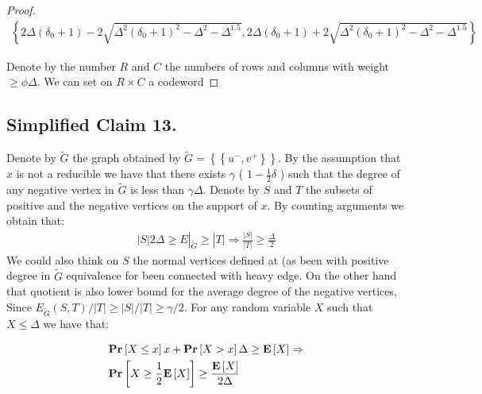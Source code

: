 \begin{proof}
\begin{equation*}
  \begin{split}
    \left\{2 \Delta \left(\delta_{0} + 1\right) - 2 \sqrt{\Delta^{2} \left(\delta_{0} + 1\right)^{2} - \Delta^{2} - \Delta^{1.5}}, 2 \Delta \left(\delta_{0} + 1\right) + 2 \sqrt{\Delta^{2} \left(\delta_{0} + 1\right)^{2} - \Delta^{2} - \Delta^{1.5}}\right\}
  \end{split}
\end{equation*}

Denote by the number $R $ and $C$ the numbers of rows and columns with weight $\ge \phi \Delta$. We can set on $R\times C$ a codeword  
                        
                        
\end{proof}             

\subsection{Simplified Claim 13.} 
\newcommand{\Gtt}{\tilde{G}}
Denote by $\Gtt$ the graph obtained by $\Gtt  = \left\{ \left\{ u^{-}, v^{+} \right\}  \right\} $. By the assumption that $x$ is not a reducible we have that there exists $\gamma$ ( $ 1- \frac{1}{2}\delta$  )  such that the degree of any negative vertex in $\Gtt$ is less than $\gamma\Delta$. Denote by $S$ and $T$ the subsets of positive and the negative vertices on the support of $x$. By counting arguments we obtain that: 
\begin{equation*}
  \begin{split}
    |S| 2\Delta \ge E|_{\Gtt} \ge  |T| \Rightarrow \frac{|S|}{|T|} \ge \frac{\Delta}{2}
  \end{split}
\end{equation*}
We could also think on $S$ the normal vertices defined at \cite{leverrier2022quantum} (as been with positive degree in $\Gtt$ equivalence for been connected with heavy edge. On the other hand that quotient is also lower bound for the average degree of the negative vertices, Since $E_{\Gtt}(S,T)/|T| \ge |S|/|T| \ge \gamma/2$. For any random variable $X$ such that $X \le \Delta$ we have that: 

  \begin{equation*}
    \begin{split}
      & \mathbf{Pr} \left[ {X\le x} \right]x+\mathbf{Pr} \left[ {X > x} \right]\Delta\ge \mathbf{E} \left[ {X} \right]\Rightarrow \\ 
      & \mathbf{Pr} \left[ {X \ge \frac{1}{2} \mathbf{E} \left[ {X} \right] } \right] \ge \frac{\mathbf{E} \left[ {X} \right]}{2\Delta}
    \end{split}
  \end{equation*}


